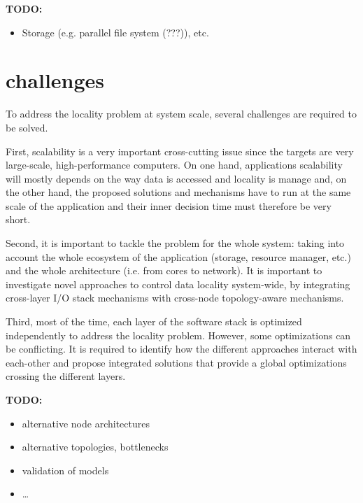 {\bf TODO:}  
\begin{itemize}
\item Storage (e.g. parallel file system (???)), etc. 
\end{itemize}

\section{challenges}
To address the locality problem at system scale, several challenges are required
to be solved. 

First, scalability is a very important cross-cutting issue since the targets are
very large-scale, high-performance computers. On one hand, applications
scalability will mostly depends on the way data is accessed and locality is
manage and, on the other hand, the proposed solutions and mechanisms have to run
at the same scale of the application and their inner decision time must
therefore be very short.

Second, it is important to tackle the problem for the whole system: taking into account
the whole ecosystem of the application (storage, resource manager, etc.) and the
whole architecture (i.e. from cores to network). It is important to investigate
novel approaches to control data locality system-wide, by integrating
cross-layer I/O stack mechanisms  with cross-node topology-aware mechanisms. 

Third, most of the time, each layer of the software stack is optimized
independently to address the locality problem. However, some optimizations can
be conflicting. It is required to identify how the different approaches interact
with each-other and propose integrated solutions that provide a global
optimizations crossing the different layers.


{\bf TODO:}  
\begin{itemize}
\item alternative node architectures
\item alternative topologies, bottlenecks
\item validation of models
\item \ldots
\end{itemize}
